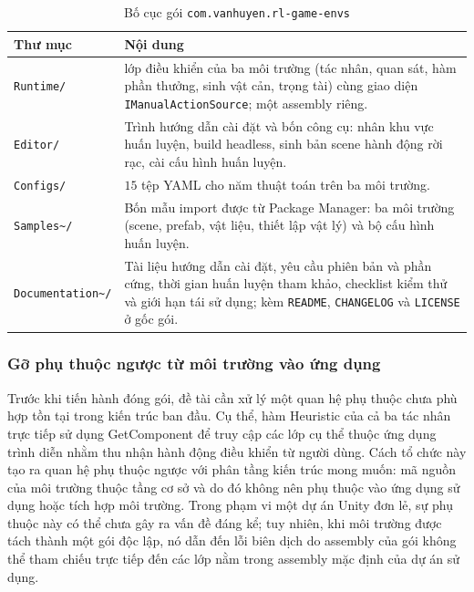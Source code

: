 \begin{table}[H]
\centering
\caption{Bố cục gói \texttt{com.vanhuyen.rl-game-envs}}
\label{tab:pkg_layout}
\renewcommand{\arraystretch}{1.3}
\tablefont
\begin{tabular}{|p{3.6cm}|>{\raggedright\arraybackslash}p{9.9cm}|}
\hline
\textbf{Thư mục} & \textbf{Nội dung} \\
\hline
\texttt{Runtime/} & 36 lớp điều khiển của ba môi trường (tác nhân, quan sát, hàm
phần thưởng, sinh vật cản, trọng tài) cùng giao diện
\texttt{IManualActionSource}; một assembly riêng. \\
\hline
\texttt{Editor/} & Trình hướng dẫn cài đặt và bốn công cụ: nhân khu vực huấn luyện,
build headless, sinh bản scene hành động rời rạc, cài cấu hình huấn luyện. \\
\hline
\texttt{Configs/} & $15$ tệp YAML cho năm thuật toán trên ba môi trường. \\
\hline
\texttt{Samples\textasciitilde/} & Bốn mẫu import được từ Package Manager: ba môi
trường (scene, prefab, vật liệu, thiết lập vật lý) và bộ cấu hình huấn luyện. \\
\hline
\texttt{Documentation\textasciitilde/} & Tài liệu hướng dẫn cài đặt, yêu cầu phiên bản
và phần cứng, thời gian huấn luyện tham khảo, checklist kiểm thử và giới hạn tái sử dụng;
kèm \texttt{README}, \texttt{CHANGELOG} và \texttt{LICENSE} ở gốc gói. \\
\hline
\end{tabular}
\end{table}

\subsubsection{Gỡ phụ thuộc ngược từ môi trường vào ứng dụng}

\indent Trước khi tiến hành đóng gói, đề tài cần xử lý một quan hệ phụ thuộc chưa phù hợp tồn tại trong kiến trúc ban đầu. Cụ thể, hàm Heuristic của cả ba tác nhân trực tiếp sử dụng GetComponent để truy cập các lớp cụ thể thuộc ứng dụng trình diễn nhằm thu nhận hành động điều khiển từ người dùng. Cách tổ chức này tạo ra quan hệ phụ thuộc ngược với phân tầng kiến trúc mong muốn: mã nguồn của môi trường thuộc tầng cơ sở và do đó không nên phụ thuộc vào ứng dụng sử dụng hoặc tích hợp môi trường. Trong phạm vi một dự án Unity đơn lẻ, sự phụ thuộc này có thể chưa gây ra vấn đề đáng kể; tuy nhiên, khi môi trường được tách thành một gói độc lập, nó dẫn đến lỗi biên dịch do assembly của gói không thể tham chiếu trực tiếp đến các lớp nằm trong assembly mặc định của dự án sử dụng.

